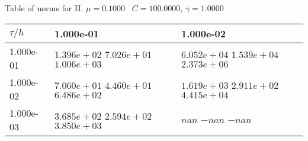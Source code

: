 \begin{center}
Table of norms for H. $\mu = 0.1000$ \, $C = 100.0000$, $\gamma = 1.0000$
  
\begin{tabular}{|p{1in}|p{1in}|p{1in}|} \hline
$\tau / h$ &1.000e-01 &1.000e-02 \\ \hline 
1.000e-01 & $1.396e+02$  $7.026e+01$  $1.006e+03$  & $6.052e+04$  $1.539e+04$  $2.373e+06$  \\ \hline 
1.000e-02 & $7.060e+01$  $4.460e+01$  $6.486e+02$  & $1.619e+03$  $2.911e+02$  $4.415e+04$  \\ \hline 
1.000e-03 & $3.685e+02$  $2.594e+02$  $3.850e+03$  & $nan$  $-nan$  $-nan$  \\ \hline 

\end{tabular}\\[20pt]
\end{center}
